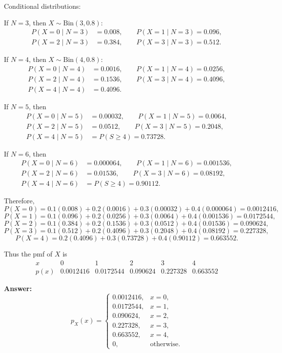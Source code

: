 \documentclass[11pt]{article}
\begin{document}
\begin{enumerate}
    Conditional distributions:

    If \(N=3\), then \(X\sim \mathrm{Bin}(3,0.8)\):
    \[
    \begin{aligned}
    P(X=0\mid N=3)&=0.008,\qquad P(X=1\mid N=3)=0.096,\\
    P(X=2\mid N=3)&=0.384,\qquad P(X=3\mid N=3)=0.512.
    \end{aligned}
    \]

    If \(N=4\), then \(X\sim \mathrm{Bin}(4,0.8)\):
    \[
    \begin{aligned}
    P(X=0\mid N=4)&=0.0016,\qquad P(X=1\mid N=4)=0.0256,\\
    P(X=2\mid N=4)&=0.1536,\qquad P(X=3\mid N=4)=0.4096,\\
    P(X=4\mid N=4)&=0.4096.
    \end{aligned}
    \]

    If \(N=5\), then
    \[
    \begin{aligned}
    P(X=0\mid N=5)&=0.00032,\qquad P(X=1\mid N=5)=0.0064,\\
    P(X=2\mid N=5)&=0.0512,\qquad P(X=3\mid N=5)=0.2048,\\
    P(X=4\mid N=5)&=P(S\ge 4)=0.73728.
    \end{aligned}
    \]

    If \(N=6\), then
    \[
    \begin{aligned}
    P(X=0\mid N=6)&=0.000064,\qquad P(X=1\mid N=6)=0.001536,\\
    P(X=2\mid N=6)&=0.01536,\qquad P(X=3\mid N=6)=0.08192,\\
    P(X=4\mid N=6)&=P(S\ge 4)=0.90112.
    \end{aligned}
    \]

    Therefore,
    \[
    P(X=0)=0.1(0.008)+0.2(0.0016)+0.3(0.00032)+0.4(0.000064)=0.0012416,
    \]
    \[
    P(X=1)=0.1(0.096)+0.2(0.0256)+0.3(0.0064)+0.4(0.001536)=0.0172544,
    \]
    \[
    P(X=2)=0.1(0.384)+0.2(0.1536)+0.3(0.0512)+0.4(0.01536)=0.090624,
    \]
    \[
    P(X=3)=0.1(0.512)+0.2(0.4096)+0.3(0.2048)+0.4(0.08192)=0.227328,
    \]
    \[
    P(X=4)=0.2(0.4096)+0.3(0.73728)+0.4(0.90112)=0.663552.
    \]

    Thus the pmf of \(X\) is
    \[
    \begin{array}{c|ccccc}
    x & 0 & 1 & 2 & 3 & 4 \\ \hline
    p(x) & 0.0012416 & 0.0172544 & 0.090624 & 0.227328 & 0.663552
    \end{array}
    \]

    \textbf{Answer:}
    \[
    \boxed{
    p_X(x)=
    \begin{cases}
    0.0012416, & x=0,\\
    0.0172544, & x=1,\\
    0.090624, & x=2,\\
    0.227328, & x=3,\\
    0.663552, & x=4,\\
    0, & \text{otherwise.}
    \end{cases}}
    \]
\end{enumerate}
\end{document}
